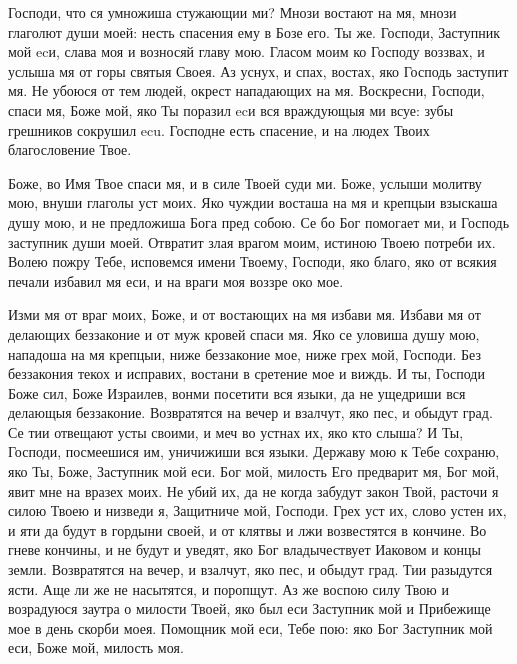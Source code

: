 

\label{_content_pravilo-svyatogo-amvrosiya}

 

\begin{mymulticols}
 




Господи, что ся умножиша стужающии ми? Мнози востают на мя, мнози глаголют души моей: несть спасения ему в Бозе его. Ты же. Господи, Заступник мой ecи, слава моя и возносяй главу мою. Гласом моим ко Господу воззвах, и услыша мя от горы святыя Своея. Аз уснух, и спах, востах, яко Господь заступит мя. Не убоюся от тем людей, окрест нападающих на мя. Воскресни, Господи, спаси мя, Боже мой, яко Ты поразил ecи вся враждующыя ми всуе: зубы грешников сокрушил ecu. Господне есть спасение, и на людех Твоих благословение Твое.




Боже, во Имя Твое спаси мя, и в силе Твоей суди ми. Боже, услыши молитву мою, внуши глаголы уст моих. Яко чуждии восташа на мя и крепцыи взыскаша душу мою, и не предложиша Бога пред собою. Се бо Бог помогает ми, и Господь заступник души моей. Отвратит злая врагом моим, истиною Твоею потреби их. Волею пожру Тебе, исповемся имени Твоему, Господи, яко благо, яко от всякия печали избавил мя еси, и на враги моя воззре око мое.




Изми мя от враг моих, Боже, и от востающих на мя избави мя. Избави мя от делающих беззаконие и от муж кровей спаси мя. Яко се уловиша душу мою, нападоша на мя крепцыи, ниже беззаконие мое, ниже грех мой, Господи. Без беззакония текох и исправих, востани в сретение мое и виждь. И ты, Господи Боже сил, Боже Израилев, вонми посетити вся языки, да не ущедриши вся делающыя беззаконие. Возвратятся на вечер и взалчут, яко пес, и обыдут град. Се тии отвещают усты своими, и меч во устнах их, яко кто слыша? И Ты, Господи, посмеешися им, уничижиши вся языки. Державу мою к Тебе сохраню, яко Ты, Боже, Заступник мой еси. Бог мой, милость Его предварит мя, Бог мой, явит мне на вразех моих. Не убий их, да не когда забудут закон Твой, расточи я силою Твоею и низведи я, Защитниче мой, Господи. Грех уст их, слово устен их, и яти да будут в гордыни своей, и от клятвы и лжи возвестятся в кончине. Во гневе кончины, и не будут и уведят, яко Бог владычествует Иаковом и концы земли. Возвратятся на вечер, и взалчут, яко пес, и обыдут град. Тии разыдутся ясти. Аще ли же не насытятся, и поропщут. Аз же воспою силу Твою и возрадуюся заутра о милости Твоей, яко был еси Заступник мой и Прибежище мое в день скорби моея. Помощник мой еси, Тебе пою: яко Бог Заступник мой еси, Боже мой, милость моя.



\end{mymulticols}
